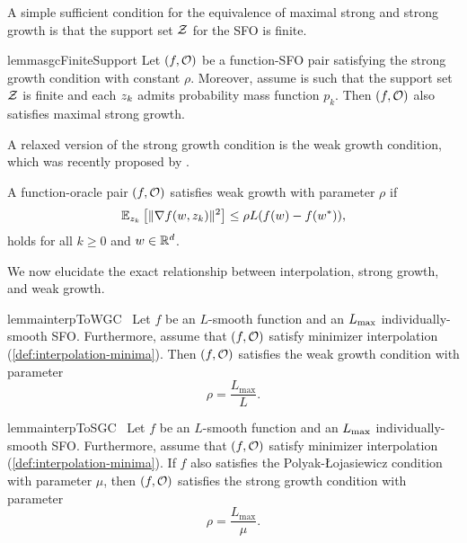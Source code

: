 A simple sufficient condition for the equivalence of maximal strong and strong growth is that the support set \( \calZ \) for the SFO is finite.
\begin{restatable}{lemma}{sgcFiniteSupport}\label{thm:sgc-finite-support}
    Let \( \rbr{f, \oracle{}} \) be a function-SFO pair satisfying the strong growth condition with constant \( \rho \).
    Moreover, assume \oracle{} is such that the support set \( \calZ \) is finite and each \( \zk \) admits probability mass function \( p_k \). 
    Then \( \rbr{f, \oracle{}} \) also satisfies maximal strong growth.
\end{restatable}
A relaxed version of the strong growth condition is the weak growth condition, which was recently proposed by \citet{vaswani2019fast}.
\begin{definition}\label{def:wgc}
    A function-oracle pair \( \rbr{f, \oracle{}} \) satisfies weak growth with parameter \(\rho \) if
    \[ \Ek \sbr{\norm{\grad(\w, \zk)}^2} \leq \rho L (f(\w) - f(\wopt)), \]
    holds for all \( k \geq 0 \) and \( \w \in \R^d\).
\end{definition}

We now elucidate the exact relationship between interpolation, strong growth, and weak growth.

\begin{restatable}{lemma}{interpToWGC}~\label{thm:interpolation-to-wgc}
    Let \( f \) be an \( L \)-smooth function and \oracle{} an \( \Lmax \) individually-smooth SFO.
    Furthermore, assume that \( \rbr{f, \oracle{}} \) satisfy minimizer interpolation (\autoref{def:interpolation-minima}).
    Then \( \rbr{f, \oracle{}} \) satisfies the weak growth condition with parameter
    \[ \rho = \frac{L_{\text{max}}}{L}. \]
\end{restatable}

\begin{restatable}{lemma}{interpToSGC}~\label{thm:interpolation_to_sgc}
    Let \( f \) be an \( L \)-smooth function and \oracle{} an \( \Lmax \) individually-smooth SFO.
    Furthermore, assume that \( \rbr{f, \oracle{}} \) satisfy minimizer interpolation (\autoref{def:interpolation-minima}).
    If \( f \) also satisfies the Polyak-Łojasiewicz condition with parameter \( \mu \), then \( \rbr{f, \oracle{}} \) satisfies the strong growth condition with parameter
    \[ \rho = \frac{L_{\text{max}}}{\mu}. \]
\end{restatable}
